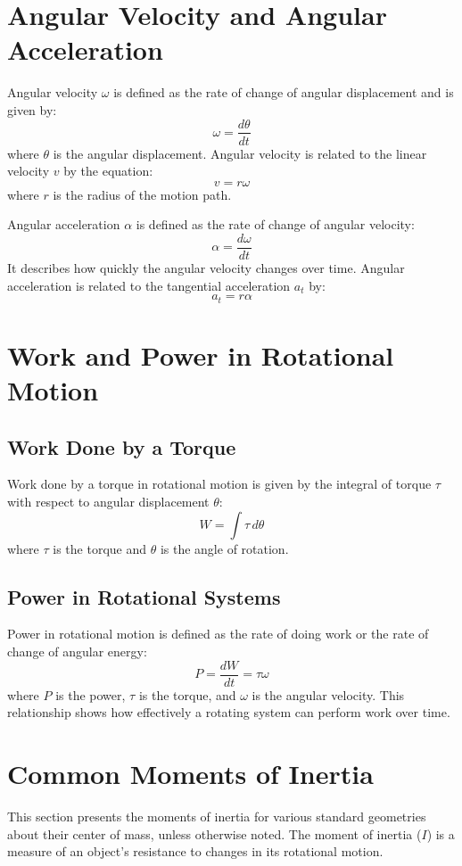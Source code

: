 \documentclass[12pt]{article}
\begin{document}
\section{Angular Velocity and Angular Acceleration}
Angular velocity \(\omega\) is defined as the rate of change of angular displacement and is given by:
\[
\omega = \frac{d\theta}{dt}
\]
where \(\theta\) is the angular displacement. Angular velocity is related to the linear velocity \(v\) by the equation:
\[
v = r \omega
\]
where \(r\) is the radius of the motion path.

Angular acceleration \(\alpha\) is defined as the rate of change of angular velocity:
\[
\alpha = \frac{d\omega}{dt}
\]
It describes how quickly the angular velocity changes over time. Angular acceleration is related to the tangential acceleration \(a_t\) by:
\[
a_t = r \alpha
\]

\section{Work and Power in Rotational Motion}
\subsection{Work Done by a Torque}
Work done by a torque in rotational motion is given by the integral of torque \(\tau\) with respect to angular displacement \(\theta\):
\[
W = \int \tau \, d\theta
\]
where \(\tau\) is the torque and \(\theta\) is the angle of rotation.

\subsection{Power in Rotational Systems}
Power in rotational motion is defined as the rate of doing work or the rate of change of angular energy:
\[
P = \frac{dW}{dt} = \tau \omega
\]
where \(P\) is the power, \(\tau\) is the torque, and \(\omega\) is the angular velocity. This relationship shows how effectively a rotating system can perform work over time.

\section{Common Moments of Inertia}

This section presents the moments of inertia for various standard geometries about their center of mass, unless otherwise noted. The moment of inertia (\(I\)) is a measure of an object's resistance to changes in its rotational motion.
\end{document}

